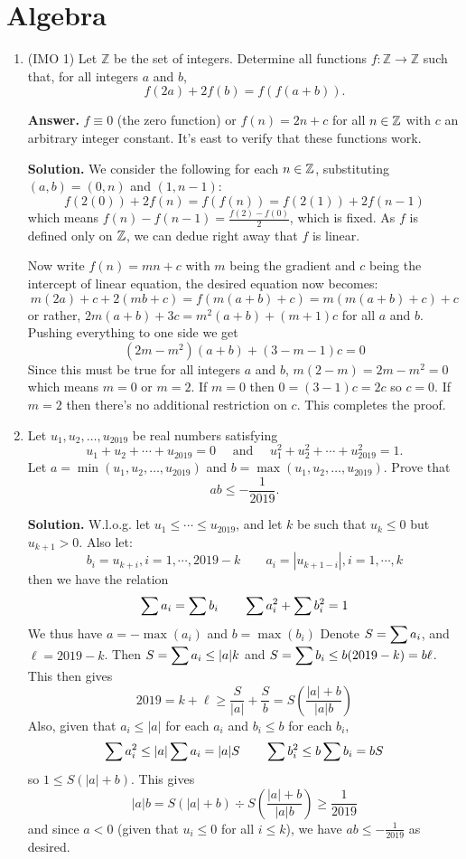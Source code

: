 \documentclass[11pt,a4paper]{article}
\begin{document}
\newpage
\section*{Algebra}
\begin{enumerate}
	\item [\textbf{A1.}] (IMO 1)
	Let $\mathbb{Z}$ be the set of integers. Determine all functions $f: \mathbb{Z} \rightarrow \mathbb{Z}$ such that, for all integers $a$ and $b$, $$f(2a)+2f(b)=f(f(a+b)).$$
	
	\textbf{Answer.} $f\equiv 0$ (the zero function) or $f(n)=2n+c$ for all $n\in{\mathbb Z}$ with $c$ an arbitrary integer constant. It's east to verify that these functions work. 
	
	\textbf{Solution.} We consider the following for each $n\in{\mathbb Z}$, substituting $(a, b)=(0, n)$ and $(1, n-1)$: 
	\[
	f(2(0)) + 2f(n) = f(f(n)) = f(2(1))+2f(n-1)
	\]
	which means $f(n)-f(n-1)=\frac{f(2)-f(0)}{2}$, which is fixed. As $f$ is defined only on ${\mathbb Z}$, we can dedue right away that $f$ is linear. 
	
	Now write $f(n)=mn+c$ with $m$ being the gradient and $c$ being the intercept of linear equation, the desired equation now becomes: 
	\[m(2a)+c + 2(mb+c) = f(m(a+b)+c) = m(m(a+b)+c)+c
	\]
	or rather, $2m(a+b)+3c = m^2(a+b) + (m+1)c$ for all $a$ and $b$. Pushing everything to one side we get 
	\[
	(2m-m^2)(a+b)+(3-m-1)c = 0
	\]
	Since this must be true for all integers $a$ and $b$, $m(2-m)=2m-m^2=0$ which means $m=0$ or $m=2$. 
	If $m=0$ then $0=(3-1)c=2c$ so $c=0$. If $m=2$ then there's no additional restriction on $c$. This completes the proof. 
	
	\item [\textbf{A2.}]
	Let $u_1, u_2, \dots, u_{2019}$ be real numbers satisfying \[u_{1}+u_{2}+\cdots+u_{2019}=0 \quad \text { and } \quad u_{1}^{2}+u_{2}^{2}+\cdots+u_{2019}^{2}=1.\]Let $a=\min \left(u_{1}, u_{2}, \ldots, u_{2019}\right)$ and $b=\max \left(u_{1}, u_{2}, \ldots, u_{2019}\right)$. Prove that
	\[
	a b \leqslant-\frac{1}{2019}.
	\]
	
	\textbf{Solution.} W.l.o.g. let $u_1\le \cdots \le u_{2019}$, and let $k$ be such that $u_k\le 0$ but $u_{k+1}>0$. 
	Also let: 
	\[
	b_i = u_{k+i}, i=1, \cdots , 2019-k\qquad a_i = |u_{k+1-i}|, i=1,\cdots , k
	\]
	then we have the relation 
	\[
	\displaystyle\sum a_i = \displaystyle\sum b_i \qquad \displaystyle\sum a_i^2 + \displaystyle\sum b_i^2 = 1
	\]
	We thus have $a=-\max(a_i)$ and $b=\max(b_i)$
	Denote $S=\displaystyle\sum a_i$, and $\ell=2019-k$. Then $S=\displaystyle\sum a_i \le |a|k$ and $S=\displaystyle\sum b_i\le b(2019-k)=b\ell$. This then gives
	\[
	2019=k+\ell \ge \frac{S}{|a|}+\frac{S}{b}=S(\frac{|a|+b}{|a|b})
	\]
	Also, given that $a_i\le |a|$ for each $a_i$ and $b_i\le b$ for each $b_i$, 
	\[
	\displaystyle\sum a_i^2\le |a|\displaystyle\sum a_i=|a|S\qquad \displaystyle\sum b_i^2\le b\displaystyle\sum b_i = bS
	\]
	so $1\le S(|a|+b)$. This gives 
	\[
	|a|b=S(|a|+b)\div S(\frac{|a|+b}{|a|b})\ge \frac{1}{2019}
	\]
	and since $a<0$ (given that $u_i\le 0$ for all $i\le k$), we have $ab\le -\frac{1}{2019}$ as desired. 
	

\end{enumerate}
\end{document}
